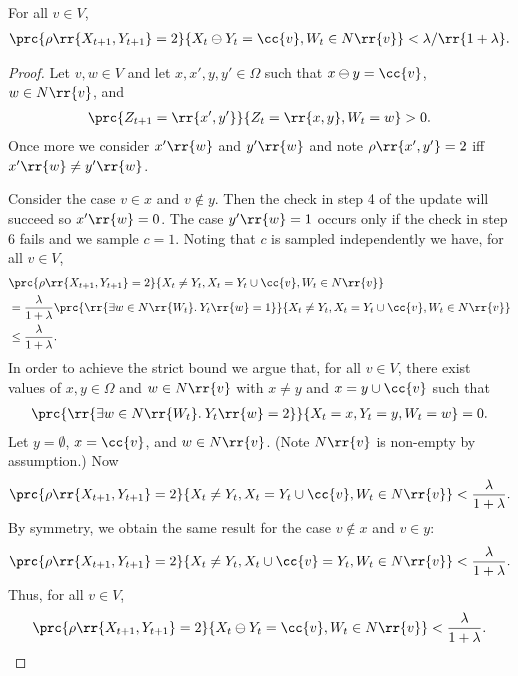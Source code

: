 \documentclass{article}
\begin{document}
\begin{claim*}[3c]
  For all $v\in V$,
  \begin{align*}
    \prc{\rho\rr{X_{t+1},Y_{t+1}}=2}{X_t\ominus Y_t=\cc{v},W_t\in N\rr{v}}<\lambda/\rr{1+\lambda}.
  \end{align*}
  \begin{proof}
    Let $v,w\in V$ and let $x,x',y,y'\in\Omega$ such that $x\ominus y=\cc{v}$,
    $w\in N\rr{v}$, and
    \begin{align*}
      \prc{Z_{t+1}=\rr{x',y'}}{Z_t=\rr{x,y},W_t=w}>0.
    \end{align*}
    Once more we consider $x'\rr{w}$ and $y'\rr{w}$ and note $\rho\rr{x', y'}=2$
    iff $x'\rr{w}\neq y'\rr{w}$.

    Consider the case $v\in x$ and $v\not\in y$. Then the check in step 4 of the update
    will succeed so $x'\rr{w}=0$. The case $y'\rr{w}=1$ occurs only if the check in step
    6 fails and we sample $c=1$. Noting that $c$ is sampled independently we have, for all $v\in V$,
    \begin{align*}
       &\prc{\rho\rr{X_{t+1},Y_{t+1}}=2}{X_t\neq Y_t, X_t=Y_t\cup\cc{v},W_t\in N\rr{v}}\\
       &= \frac{\lambda}{1+\lambda}\prc{\rr{\exists w\in N\rr{W_t}. \: Y_t\rr{w}=1}}{X_t\neq Y_t, X_t=Y_t\cup\cc{v},W_t\in N\rr{v}} \\
       &\leq \frac{\lambda}{1+\lambda}.
    \end{align*}
    In order to achieve the strict bound we argue that, for all $v\in V$, there exist values
    of $x,y\in\Omega$ and $w\in N\rr{v}$ with $x\neq y$ and $x=y\cup\cc{v}$ such that
    \begin{align*}
      \prc{\rr{\exists w\in N\rr{W_t}. \: Y_t\rr{w}=2}}{X_t=x,Y_t=y,W_t=w} = 0.
    \end{align*}
    Let $y=\emptyset$, $x=\cc{v}$, and $w\in N\rr{v}$. (Note $N\rr{v}$ is non-empty by assumption.)
    Now
    \begin{align*}
      \prc{\rho\rr{X_{t+1},Y_{t+1}}=2}{X_t\neq Y_t, X_t=Y_t\cup\cc{v},W_t\in N\rr{v}} < \frac{\lambda}{1+\lambda}.
    \end{align*}
    By symmetry, we obtain the same result for the case $v\not\in x$ and $v\in y$:
    \begin{align*}
      \prc{\rho\rr{X_{t+1},Y_{t+1}}=2}{X_t\neq Y_t, X_t\cup\cc{v}=Y_t,W_t\in N\rr{v}} < \frac{\lambda}{1+\lambda}.
    \end{align*}
    Thus, for all $v\in V$,
    \begin{align*}
      \prc{\rho\rr{X_{t+1},Y_{t+1}}=2}{X_t\ominus Y_t=\cc{v},W_t\in N\rr{v}} < \frac{\lambda}{1+\lambda}.
    \end{align*}
  \end{proof}
\end{claim*}
\end{document}
